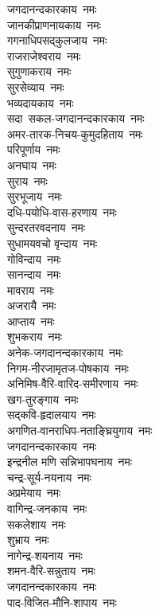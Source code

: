 \begin{flushleft}
\begin{multicols}{2}
जगदानन्दकारकाय~नमः\\
जानकीप्राणनायकाय~नमः\\
गगनाधिपसद्कुलजाय~नमः\\
राजराजेश्वराय~नमः\\
सुगुणाकराय~नमः\\
सुरसेव्याय~नमः\\
भव्यदायकाय~नमः\\
सदा~सकल-जगदानन्दकारकाय~नमः\\
अमर-तारक-निचय-कुमुदहिताय~नमः\\
परिपूर्णाय~नमः\hfill{}\\
अनघाय~नमः\\
सुराय~नमः\\
सुरभूजाय~नमः\\
दधि-पयोधि-वास-हरणाय~नमः\\
सुन्दरतरवदनाय~नमः\\
सुधामयवचो वृन्दाय~नमः\\
गोविन्दाय~नमः\\
सानन्दाय~नमः\\
मावराय~नमः\\
अजरायै~नमः\hfill{}\\
आप्ताय~नमः\\
शुभकराय~नमः\\
अनेक-जगदानन्दकारकाय~नमः\\
निगम-नीरजामृतज-पोषकाय~नमः\\
अनिमिष-वैरि-वारिद-समीरणाय~नमः\\
खग-तुरङ्गाय~नमः\\
सद्कवि-हृदालयाय~नमः\\
अगणित-वानराधिप-नताङ्घ्रियुगाय~नमः\\
जगदानन्दकारकाय~नमः\\
इन्द्रनील मणि सन्निभापघनाय~नमः\hfill{}\\
चन्द्र-सूर्य-नयनाय~नमः\\
अप्रमेयाय~नमः\\
वागिन्द्र-जनकाय~नमः\\
सकलेशाय~नमः\\
शुभ्राय~नमः\\
नागेन्द्र-शयनाय~नमः\\
शमन-वैरि-सन्नुताय~नमः\\
जगदानन्दकारकाय~नमः\\
पाद-विजित-मौनि-शापाय~नमः\\

\end{multicols}
\end{flushleft}
